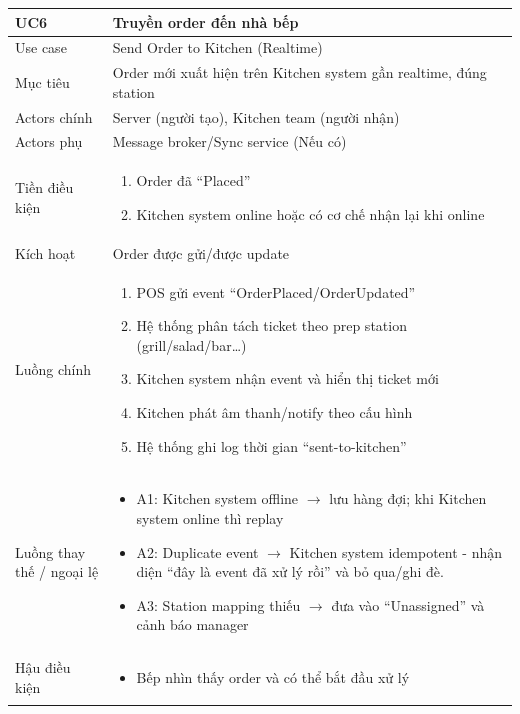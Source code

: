 \begin{longtable}{|>{\raggedright\arraybackslash}p{}|>{\raggedright\arraybackslash}p{}|}
\hline
\textbf{UC6} & \textbf{Truyền order đến nhà bếp} \\
\hline
Use case & Send Order to Kitchen (Realtime) \\
\hline
Mục tiêu & Order mới xuất hiện trên Kitchen system gần realtime, đúng station \\
\hline
Actors chính & Server (người tạo), Kitchen team (người nhận) \\
\hline
Actors phụ & Message broker/Sync service (Nếu có) \\
\hline
Tiền điều kiện &
\vspace{-0.5em}
\begin{enumerate}[leftmargin=*]
\item Order đã “Placed”
\item Kitchen system online hoặc có cơ chế nhận lại khi online
\end{enumerate}
\vspace{-0.5em}
\\
\hline
Kích hoạt & Order được gửi/được update \\
\hline
Luồng chính &
\vspace{-0.5em}
\begin{enumerate}[leftmargin=*]
\item POS gửi event “OrderPlaced/OrderUpdated”
\item Hệ thống phân tách ticket theo prep station (grill/salad/bar…)
\item Kitchen system nhận event và hiển thị ticket mới
\item Kitchen phát âm thanh/notify theo cấu hình
\item Hệ thống ghi log thời gian “sent-to-kitchen”
\end{enumerate}
\vspace{-0.5em}
\\
\hline
Luồng thay thế / ngoại lệ &
\vspace{-0.5em}
\begin{itemize}[leftmargin=*]
\item A1: Kitchen system offline $\rightarrow$ lưu hàng đợi; khi Kitchen system online thì replay
\item A2: Duplicate event $\rightarrow$ Kitchen system idempotent - nhận diện “đây là event đã xử lý rồi” và bỏ qua/ghi đè.
\item A3: Station mapping thiếu $\rightarrow$ đưa vào “Unassigned” và cảnh báo manager
\end{itemize}
\vspace{-0.5em}
\\
\hline
Hậu điều kiện &
\vspace{-0.5em}
\begin{itemize}[leftmargin=*]
\item Bếp nhìn thấy order và có thể bắt đầu xử lý
\end{itemize}
\vspace{-0.5em}
\\
\hline
\end{longtable}

